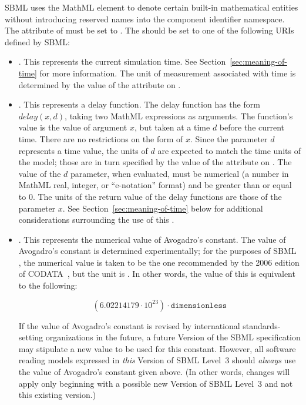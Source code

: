 SBML \thisL uses the MathML  element to denote
certain built-in mathematical entities without introducing
reserved names into the component identifier namespace.  The
 attribute of  must be set to
.  The  should be set to one of the
following URIs defined by SBML:
\begin{itemize}

\item {}.  This
  represents the current simulation time.  See
  Section~\ref{sec:meaning-of-time} for more information.  The
  unit of measurement associated with time is determined by the
  value of the  attribute on \Model.

\item {}.  This
  represents a delay function.  The delay function has the form
  $delay(x, d)$, taking two MathML expressions as arguments.  The
  function's value is the value of argument $x$, but taken at a
  time $d$ before the current time.  There are no restrictions on
  the form of $x$.  Since the parameter $d$ represents a time
  value, the units of $d$ are expected to match the time units of
  the model; those are in turn specified by the value of the
  attribute  on \Model.  The value of the $d$
  parameter, when evaluated, must be numerical (\ie a number in
  MathML real, integer, or ``e-notation'' format) and be greater
  than or equal to 0.  The units of the return value of the delay
  functions are those of the parameter $x$.  See
  Section~\ref{sec:meaning-of-time} below for additional
  considerations surrounding the use of this .

\item {}.  This
  represents the numerical value of Avogadro's constant.  The
  value of Avogadro's constant is determined experimentally; for
  the purposes of SBML \thisLVnum, the numerical value is taken to
  be the one recommended by the 2006 edition of
  CODATA~\citep{codata_2008}, but the unit is
  .  In other words, the value of this
   is equivalent to the following:
  \begin{linenomath}
    \begin{equation*}
      (6.02214179 \cdot 10^{23}) \cdot \texttt{dimensionless}
    \end{equation*}
  \end{linenomath}
  If the value of Avogadro's constant is revised by international
  standards-setting organizations in the future, a future Version
  of the SBML \thisL specification may stipulate a new value to be
  used for this  constant.  However, all software
  reading models expressed in \emph{this} Version of SBML Level~3
  should \emph{always} use the value of Avogadro's constant given
  above.  (In other words, changes will apply only beginning with
  a possible new Version of SBML Level~3 and not this existing
  version.)

\end{itemize}

